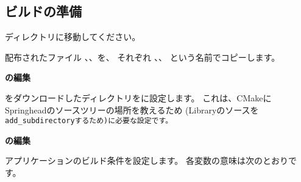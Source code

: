 \subsection{ビルドの準備}
\label{subsec:PreparationForApp}
\parindent=0pt

ディレクトリ\AppTop{}に移動してください。

配布されたファイル
、、を、
それぞれ
\QCMakeTopdir{}、\CMakeLists{}、\QCMakeSettings{}
という名前でコピーします。


\medskip
{}

\bigskip
\bf{\QCMakeTopdir{}}の編集

\medskip
\SprLib{}をダウンロードしたディレクトリを\QCMakeTopdir{}に設定します。
これは、CMakeにSpringheadのソースツリーの場所を教えるため
(Libraryのソースを\tt{add\_subdirectory}するため)に必要な設定です。


\bigskip
\bf{\QCMakeSettings{}}の編集

\medskip
アプリケーションのビルド条件を設定します。 各変数の意味は次のとおりです。

\def\SetRelPath{\tt{RELATIVE \$\{CMAKE\_SOURCE\_DIR\}}}
\def\CMakeSrcDir{\tt{\$\{CMAKE\_SOURCE\_DIR\}}}

\def\HLine{\cline{2-3}}
\def\Width{255pt}
\def\LBox#1{%
	\vbox{\hbox{\tt{#1}}\vfill}}
\def\RBox#1{%
	\parbox[t]{\Width}{%
	\Vskip{-.4\baselineskip}#1\Vskip{-.3\baselineskip}}}
	
